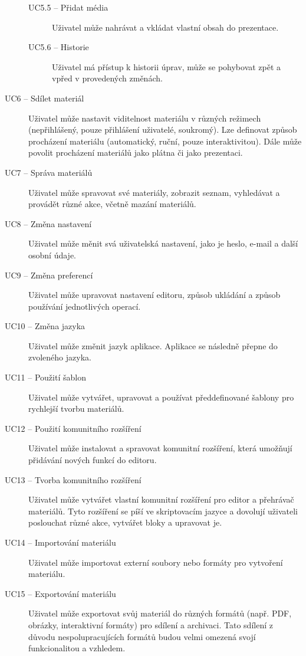 \begin{description}
\begin{description}
            \item[UC5.5 -- Přidat média]
            Uživatel může nahrávat a vkládat vlastní obsah do prezentace.
            
            \item[UC5.6 -- Historie]
            Uživatel má přístup k historii úprav, může se pohybovat zpět a vpřed v provedených změnách.
        \end{description}
    
    \item[UC6 -- Sdílet materiál]
    Uživatel může nastavit viditelnost materiálu v různých režimech (nepřihlášený, pouze přihlášení uživatelé, soukromý). Lze definovat způsob procházení materiálu (automatický, ruční, pouze interaktivitou). Dále může povolit procházení materiálů jako plátna či jako prezentaci.
    
    \item[UC7 -- Správa materiálů]
    Uživatel může spravovat své materiály, zobrazit seznam, vyhledávat a provádět různé akce, včetně mazání materiálů.
    
    \item[UC8 -- Změna nastavení]
    Uživatel může měnit svá uživatelská nastavení, jako je heslo, e-mail a další osobní údaje.
    
    \item[UC9 -- Změna preferencí]
    Uživatel může upravovat nastavení editoru, způsob ukládání a způsob používání jednotlivých operací.
    
    \item[UC10 -- Změna jazyka]
    Uživatel může změnit jazyk aplikace. Aplikace se následně přepne do zvoleného jazyka. 
    
    \item[UC11 -- Použití šablon]
    Uživatel může vytvářet, upravovat a používat předdefinované šablony pro rychlejší tvorbu materiálů.

    \item[UC12 -- Použití komunitního rozšíření]
    Uživatel může instalovat a spravovat komunitní rozšíření, která umožňují přidávání nových funkcí do editoru.

    
    \item[UC13 -- Tvorba komunitního rozšíření]
    Uživatel může vytvářet vlastní komunitní rozšíření pro editor a přehrávač materiálů. Tyto rozšíření se píší ve skriptovacím jazyce a dovolují uživateli poslouchat různé akce, vytvářet bloky a upravovat je.
    
    \item[UC14 -- Importování materiálu]
    Uživatel může importovat externí soubory nebo formáty pro vytvoření materiálu.
    
    \item[UC15 -- Exportování materiálu]
    Uživatel může exportovat svůj materiál do různých formátů (např. PDF, obrázky, interaktivní formáty) pro sdílení a archivaci. Tato sdílení z důvodu nespolupracujících formátů budou velmi omezená svojí funkcionalitou a vzhledem.
\end{description}


